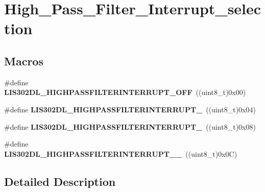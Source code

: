 \hypertarget{group___high___pass___filter___interrupt__selection}{\section{High\-\_\-\-Pass\-\_\-\-Filter\-\_\-\-Interrupt\-\_\-selection}
\label{group___high___pass___filter___interrupt__selection}
}
\subsection*{Macros}
\begin{DoxyCompactItemize}
\item 
\hypertarget{group___high___pass___filter___interrupt__selection_ga45884b8a0c0c27f0788bef15d5cbb1dc}{\#define {\bfseries L\-I\-S302\-D\-L\-\_\-\-H\-I\-G\-H\-P\-A\-S\-S\-F\-I\-L\-T\-E\-R\-I\-N\-T\-E\-R\-R\-U\-P\-T\-\_\-\-O\-F\-F}~((uint8\-\_\-t)0x00)}\label{group___high___pass___filter___interrupt__selection_ga45884b8a0c0c27f0788bef15d5cbb1dc}

\item 
\hypertarget{group___high___pass___filter___interrupt__selection_ga05e4a4e6ac2a96c60459f2a028f86e93}{\#define {\bfseries L\-I\-S302\-D\-L\-\_\-\-H\-I\-G\-H\-P\-A\-S\-S\-F\-I\-L\-T\-E\-R\-I\-N\-T\-E\-R\-R\-U\-P\-T\-\_}~((uint8\-\_\-t)0x04)}\label{group___high___pass___filter___interrupt__selection_ga05e4a4e6ac2a96c60459f2a028f86e93}

\item 
\hypertarget{group___high___pass___filter___interrupt__selection_ga4a70f96c7cc5a61cfdb66b7d3db7e34f}{\#define {\bfseries L\-I\-S302\-D\-L\-\_\-\-H\-I\-G\-H\-P\-A\-S\-S\-F\-I\-L\-T\-E\-R\-I\-N\-T\-E\-R\-R\-U\-P\-T\-\_}~((uint8\-\_\-t)0x08)}\label{group___high___pass___filter___interrupt__selection_ga4a70f96c7cc5a61cfdb66b7d3db7e34f}

\item 
\hypertarget{group___high___pass___filter___interrupt__selection_ga62d87da691d90c8fd68c727c17e678a0}{\#define {\bfseries L\-I\-S302\-D\-L\-\_\-\-H\-I\-G\-H\-P\-A\-S\-S\-F\-I\-L\-T\-E\-R\-I\-N\-T\-E\-R\-R\-U\-P\-T\-\_\-\_}~((uint8\-\_\-t)0x0\-C)}\label{group___high___pass___filter___interrupt__selection_ga62d87da691d90c8fd68c727c17e678a0}

\end{DoxyCompactItemize}


\subsection{Detailed Description}
